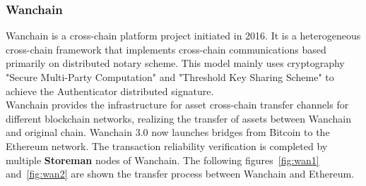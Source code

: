 \subsubsection{Wanchain}
\noindent Wanchain\cite{wanchain.org} is a cross-chain platform project initiated in 2016. It is a heterogeneous cross-chain framework that implements cross-chain communications based primarily on distributed notary scheme. This model mainly uses cryptography "Secure Multi-Party Computation" and "Threshold Key Sharing Scheme" to achieve the Authenticator distributed signature.\\

\noindent Wanchain provides the infrastructure for asset cross-chain transfer channels for different blockchain networks, realizing the transfer of assets between Wanchain and original chain. Wanchain 3.0 now launches bridges from Bitcoin to the Ethereum network. The transaction reliability verification is completed by multiple \textbf{Storeman} nodes of Wanchain. The following figures~\ref{fig:wan1} and~\ref{fig:wan2} are shown the transfer process between Wanchain and Ethereum.

